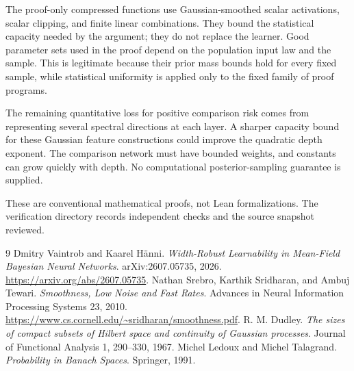 \documentclass[11pt]{article}
\theoremstyle{remark}\newtheorem{remark}[theorem]{Remark}
\begin{document}
The proof-only compressed functions use Gaussian-smoothed scalar activations, scalar clipping, and finite linear combinations. They bound the statistical capacity needed by the argument; they do not replace the learner. Good parameter sets used in the proof depend on the population input law and the sample. This is legitimate because their prior mass bounds hold for every fixed sample, while statistical uniformity is applied only to the fixed family of proof programs.

The remaining quantitative loss for positive comparison risk comes from representing several spectral directions at each layer. A sharper capacity bound for these Gaussian feature constructions could improve the quadratic depth exponent. The comparison network must have bounded weights, and constants can grow quickly with depth. No computational posterior-sampling guarantee is supplied.

These are conventional mathematical proofs, not Lean formalizations. The verification directory records independent checks and the source snapshot reviewed.

\begin{thebibliography}{9}
 Dmitry Vaintrob and Kaarel H\"anni. \emph{Width-Robust Learnability in Mean-Field Bayesian Neural Networks}. arXiv:2607.05735, 2026. \url{https://arxiv.org/abs/2607.05735}.
 Nathan Srebro, Karthik Sridharan, and Ambuj Tewari. \emph{Smoothness, Low Noise and Fast Rates}. Advances in Neural Information Processing Systems 23, 2010. \url{https://www.cs.cornell.edu/~sridharan/smoothness.pdf}.
 R. M. Dudley. \emph{The sizes of compact subsets of Hilbert space and continuity of Gaussian processes}. Journal of Functional Analysis 1, 290--330, 1967.
 Michel Ledoux and Michel Talagrand. \emph{Probability in Banach Spaces}. Springer, 1991.
\end{thebibliography}
\end{document}

